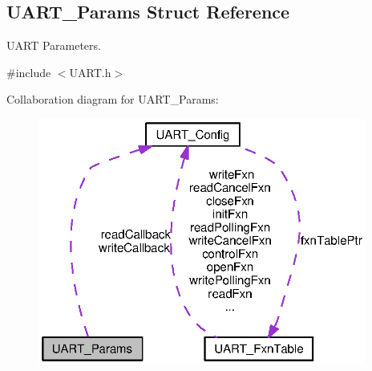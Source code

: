 \subsection{U\+A\+R\+T\+\_\+\+Params Struct Reference}
\label{struct_u_a_r_t___params}


U\+A\+R\+T Parameters.  




{\ttfamily \#include $<$U\+A\+R\+T.\+h$>$}



Collaboration diagram for U\+A\+R\+T\+\_\+\+Params\+:
\nopagebreak
\begin{figure}[H]
\begin{center}
\leavevmode
\includegraphics[width=306pt]{struct_u_a_r_t___params__coll__graph}
\end{center}
\end{figure}
